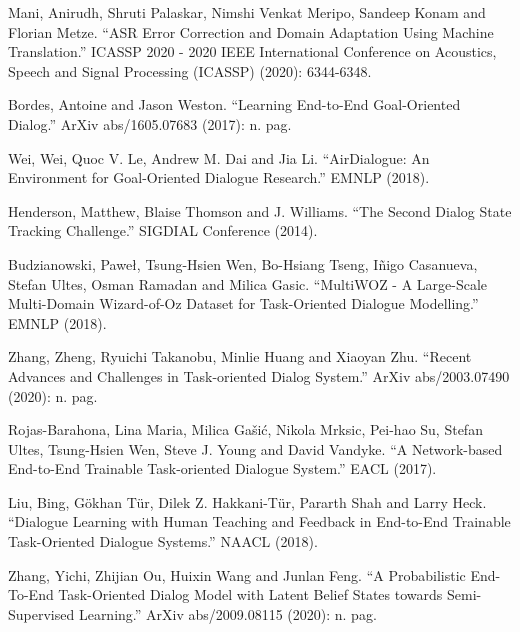 \documentclass[11pt,dvipdfm]{article}
\begin{document}
\begin{thebibliography}{10}
\begin{small}
 Mani, Anirudh, Shruti Palaskar, Nimshi Venkat Meripo, Sandeep Konam and Florian Metze. “ASR Error Correction and Domain Adaptation Using Machine Translation.” ICASSP 2020 - 2020 IEEE International Conference on Acoustics, Speech and Signal Processing (ICASSP) (2020): 6344-6348.

 Bordes, Antoine and Jason Weston. “Learning End-to-End Goal-Oriented Dialog.” ArXiv abs/1605.07683 (2017): n. pag.

 Wei, Wei, Quoc V. Le, Andrew M. Dai and Jia Li. “AirDialogue: An Environment for Goal-Oriented Dialogue Research.” EMNLP (2018).

 Henderson, Matthew, Blaise Thomson and J. Williams. “The Second Dialog State Tracking Challenge.” SIGDIAL Conference (2014).

 Budzianowski, Paweł, Tsung-Hsien Wen, Bo-Hsiang Tseng, Iñigo Casanueva, Stefan Ultes, Osman Ramadan and Milica Gasic. “MultiWOZ - A Large-Scale Multi-Domain Wizard-of-Oz Dataset for Task-Oriented Dialogue Modelling.” EMNLP (2018).

 Zhang, Zheng, Ryuichi Takanobu, Minlie Huang and Xiaoyan Zhu. “Recent Advances and Challenges in Task-oriented Dialog System.” ArXiv abs/2003.07490 (2020): n. pag.



 Rojas-Barahona, Lina Maria, Milica Gašić, Nikola Mrksic, Pei-hao Su, Stefan Ultes, Tsung-Hsien Wen, Steve J. Young and David Vandyke. “A Network-based End-to-End Trainable Task-oriented Dialogue System.” EACL (2017).

 Liu, Bing, Gökhan Tür, Dilek Z. Hakkani-Tür, Pararth Shah and Larry Heck. “Dialogue Learning with Human Teaching and Feedback in End-to-End Trainable Task-Oriented Dialogue Systems.” NAACL (2018).

 Zhang, Yichi, Zhijian Ou, Huixin Wang and Junlan Feng. “A Probabilistic End-To-End Task-Oriented Dialog Model with Latent Belief States towards Semi-Supervised Learning.” ArXiv abs/2009.08115 (2020): n. pag.


\end{small}
\end{thebibliography}
\end{document}
